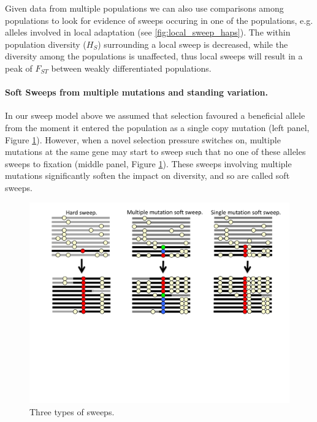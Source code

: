 Given data from multiple populations we can also use comparisons among
populations to look for evidence of sweeps occuring in one of the
populations, e.g. alleles involved in local adaptation (see \ref{fig:local_sweep_haps}). The within population diversity ($H_S$)
surrounding a local sweep is decreased, while the diversity among the
populations is unaffected, thus local sweeps will result in a peak of
$F_{ST}$ between weakly differentiated populations. 


\paragraph{Soft Sweeps from multiple mutations and standing variation.}
In our sweep model above we assumed that selection favoured a
beneficial allele from the moment it entered the population as a
single copy mutation  (left panel, Figure \ref{fig:soft_sweep_haps}). However, when a novel selection pressure
switches on, multiple mutations at the same gene
may start to sweep such that no one of these alleles sweeps
to fixation (middle panel, Figure \ref{fig:soft_sweep_haps}). These sweeps involving multiple mutations significantly
soften the impact on diversity, and so are called soft sweeps.


\begin{figure}
\begin{center}
\includegraphics[width=\textwidth]{figures/Hitchhiking/Soft_sweeps.pdf}
\end{center}
\caption{Three types of sweeps. } \label{fig:soft_sweep_haps}
\end{figure}

